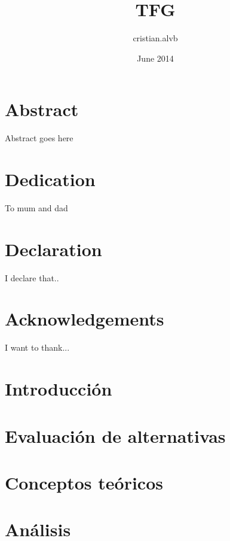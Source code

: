 \documentclass{report}
\title{TFG}
\author{cristian.alvb }
\date{June 2014}
\begin{document}
\maketitle

\chapter*{Abstract}
Abstract goes here

\chapter*{Dedication}
To mum and dad

\chapter*{Declaration}
I declare that..

\chapter*{Acknowledgements}
I want to thank...

\tableofcontents

\listoffigures

\listoftables

\chapter{Introducción}
\label{chapter01}


\chapter{Evaluación de alternativas}
\label{chapter02}


\chapter{Conceptos teóricos}
\label{chapter03}


\chapter{Análisis}
\label{chapter04}


\printbibliography
\end{document}
